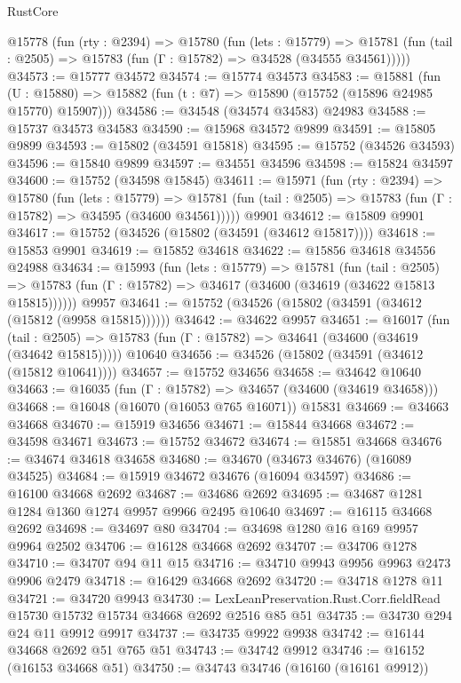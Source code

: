\begin{lexlean}{RustCore}
\begin{coremodule}
  @15778
    (fun (rty : @2394) =>
    @15780
      (fun (lets : @15779) =>
      @15781 (fun (tail : @2505) => @15783 (fun (Γ : @15782) => @34528 (@34555 @34561)))))
@34573 := @15777 @34572
@34574 := @15774 @34573
@34583 := @15881
    (fun (U : @15880) => @15882 (fun (t : @7) => @15890 (@15752 (@15896 @24985 @15770) @15907)))
@34586 := @34548 (@34574 @34583) @24983
@34588 := @15737 @34573 @34583
@34590 := @15968 @34572 @9899
@34591 := @15805 @9899
@34593 := @15802 (@34591 @15818)
@34595 := @15752 (@34526 @34593)
@34596 := @15840 @9899
@34597 := @34551 @34596
@34598 := @15824 @34597
@34600 := @15752 (@34598 @15845)
@34611 := @15971
    (fun (rty : @2394) =>
    @15780
      (fun (lets : @15779) =>
      @15781 (fun (tail : @2505) => @15783 (fun (Γ : @15782) => @34595 (@34600 @34561)))))
    @9901
@34612 := @15809 @9901
@34617 := @15752 (@34526 (@15802 (@34591 (@34612 @15817))))
@34618 := @15853 @9901
@34619 := @15852 @34618
@34622 := @15856 @34618 @34556 @24988
@34634 := @15993
    (fun (lets : @15779) =>
    @15781
      (fun (tail : @2505) =>
      @15783 (fun (Γ : @15782) => @34617 (@34600 (@34619 (@34622 @15813 @15815))))))
    @9957
@34641 := @15752 (@34526 (@15802 (@34591 (@34612 (@15812 (@9958 @15815))))))
@34642 := @34622 @9957
@34651 := @16017
    (fun (tail : @2505) => @15783 (fun (Γ : @15782) => @34641 (@34600 (@34619 (@34642 @15815)))))
    @10640
@34656 := @34526 (@15802 (@34591 (@34612 (@15812 @10641))))
@34657 := @15752 @34656
@34658 := @34642 @10640
@34663 := @16035 (fun (Γ : @15782) => @34657 (@34600 (@34619 @34658)))
@34668 := @16048 (@16070 (@16053 @765 @16071)) @15831
@34669 := @34663 @34668
@34670 := @15919 @34656
@34671 := @15844 @34668
@34672 := @34598 @34671
@34673 := @15752 @34672
@34674 := @15851 @34668
@34676 := @34674 @34618 @34658
@34680 := @34670 (@34673 @34676) (@16089 @34525)
@34684 := @15919 @34672 @34676 (@16094 @34597)
@34686 := @16100 @34668 @2692
@34687 := @34686 @2692
@34695 := @34687 @1281 @1284 @1360 @1274 @9957 @9966 @2495 @10640
@34697 := @16115 @34668 @2692
@34698 := @34697 @80
@34704 := @34698 @1280 @16 @169 @9957 @9964 @2502
@34706 := @16128 @34668 @2692
@34707 := @34706 @1278
@34710 := @34707 @94 @11 @15
@34716 := @34710 @9943 @9956 @9963 @2473 @9906 @2479
@34718 := @16429 @34668 @2692
@34720 := @34718 @1278 @11
@34721 := @34720 @9943
@34730 := LexLeanPreservation.Rust.Corr.fieldRead @15730 @15732 @15734 @34668 @2692 @2516 @85 @51
@34735 := @34730 @294 @24 @11 @9912 @9917
@34737 := @34735 @9922 @9938
@34742 := @16144 @34668 @2692 @51 @765 @51
@34743 := @34742 @9912
@34746 := @16152 (@16153 @34668 @51)
@34750 := @34743 @34746 (@16160 (@16161 @9912))

\end{coremodule}
\end{lexlean}
